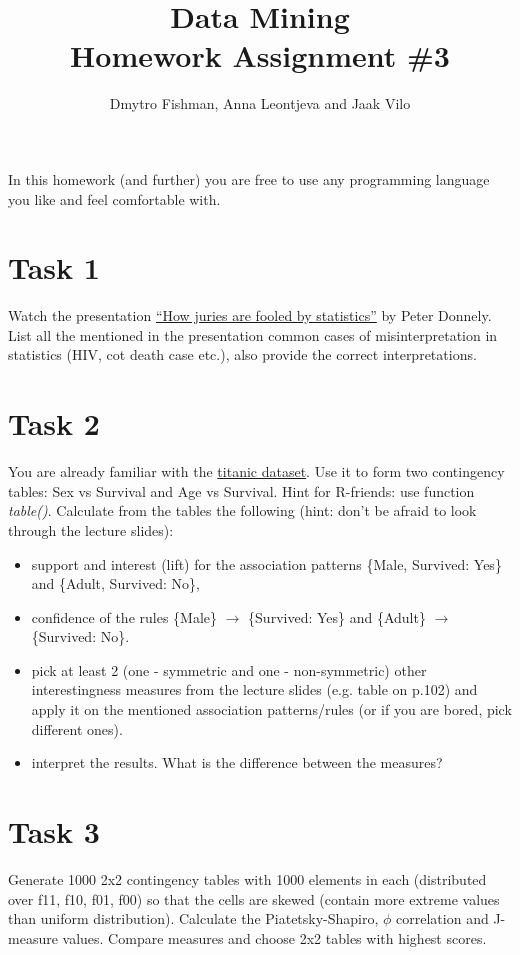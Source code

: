 \documentclass{article}
\title{Data Mining\\Homework Assignment \#3} %
\author{Dmytro Fishman, Anna Leontjeva and Jaak Vilo} %
\begin{document}
\maketitle %

In this homework (and further) you are free to use any programming language you like and feel comfortable with.
\section*{Task 1}
Watch the presentation \href{http://www.ted.com/talks/peter_donnelly_shows_how_stats_fool_juries.html}{``How juries are fooled by statistics''} by Peter Donnely. List all the mentioned in the presentation common cases of misinterpretation in statistics (HIV, cot death case etc.), also provide the correct interpretations.
\section*{Task 2}
You are already familiar with the \href{https://courses.cs.ut.ee/MTAT.03.183/2014_spring/uploads/Main/titanic.txt}{titanic dataset}. Use it to form two contingency tables: Sex vs Survival and Age vs Survival. Hint for R-friends: use function \emph{table()}. Calculate from the tables the following (hint: don't be afraid to look through the lecture slides):
\begin{itemize}
\item support and interest (lift) for the association patterns \{Male, Survived: Yes\} and \{Adult, Survived: No\},
\item confidence of the rules \{Male\} $\rightarrow$ \{Survived: Yes\} and \{Adult\} $\rightarrow$ \{Survived: No\}. 
\item pick at least 2 (one - symmetric and one - non-symmetric) other interestingness measures from the lecture slides (e.g. table on p.102) and apply it on the mentioned association patterns/rules (or if you are bored, pick different ones).
\item interpret the results. What is the difference between the measures?  
\end{itemize} 

\section*{Task 3}
Generate 1000 2x2 contingency tables with 1000 elements in each (distributed over f11, f10, f01, f00) so that the cells are skewed (contain more extreme values than uniform distribution). Calculate the Piatetsky-Shapiro, $\phi$ correlation and J-measure values. Compare measures and choose 2x2 tables with highest scores.
\end{document}
